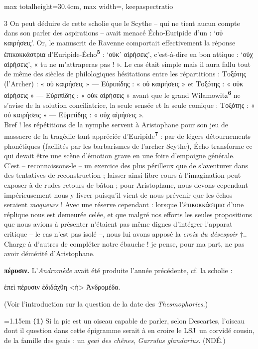 \documentclass[11pt,twoside]{book}
\newcommand{\italique}[1]{\textit{#1}}
\newcommand{\citComm}[1]{\begin{quoting}[vskip=0.4pt,leftmargin=0.7em,rightmargin=0.2em]#1\end{quoting}}
\newcommand{\LSJ}{LSJ}
\newcommand{\latin}[1]{\textit{#1}}
\newcommand{\marqueur}[1]{\textsuperscript{\color{rubricRed}\textbf{#1}}}
\begin{document}
\begin{adjustbox}{max totalheight=30.4cm, max width=\textwidth, keepaspectratio}
\begin{minipage}{\textwidth}
{\begin{multicols}{3}
\noindent On peut déduire de cette scholie que le Scythe – qui ne tient aucun compte dans son parler des aspirations – avait menacé Écho-Euripide d'un : `οὐ καιρήσεις'. Or, le manuscrit de Ravenne comportait effectivement la réponse ἐπικοκκάστρια d'Euripide-Écho\marqueur{5} : `οὐκ᾽ αἰρήσεις', c'est-à-dire en bon attique : `οὐχ αἱρήσεις', « tu ne m'attraperas pas ! ». Le cas était simple mais il aura fallu tout de même des siècles de philologiques hésitations entre les répartitions : Τοξότης (l'Archer) : « οὐ καιρήσεις » — Εὐριπίδης : « οὐ καιρήσεις » et Τοξότης : « οὐκ αἰρήσεις » — Εὐριπίδης : « οὐκ αἰρήσεις » avant que le grand Wilamowitz\marqueur{6} ne s'avise de la solution conciliatrice, la seule sensée et la seule comique : Τοξότης : « οὐ καιρήσεις » — Εὐριπίδης : « οὐχ αἱρήσεις ».\\ Bref ! les répétitions de la nymphe servent à Aristophane pour son jeu de massacre de la tragédie tant appréciée d'Euripide\marqueur{7} : par de légers détournements phonétiques (facilités par les barbarismes de l'archer Scythe), Écho transforme ce qui devait être une scène d'émotion grave en une foire d'empoigne générale.\\ C'est -- reconnaissons-le -- un exercice des plus périlleux que de s'aventurer dans des tentatives de reconstruction ; laisser ainsi libre cours à l'imagination peut exposer à de rudes retours de bâton ; pour Aristophane, nous devons cependant impérieusement nous y livrer puisqu'il vient de nous prévenir que les échos seraient \italique{moqueurs} ! Avec une réserve cependant : lorsque l'ἐπικοκκάστρια d'une réplique nous est demeurée celée, et que malgré nos efforts les seules propositions que nous avions à présenter n'étaient pas même dignes d'intégrer l'apparat critique -- le cas n'est pas isolé --, nous lui avons apposé la \italique{croix du désespoir} †.. Charge à d'autres de compléter notre ébauche ! je pense, pour ma part, ne pas avoir démérité d'Aristophane.
\par\vspace{1.5pt}
 \textbf{πέρυσιν.} L'\italique{Andromède} avait été produite l'année précédente, cf. la scholie :
\citComm{ἐπεὶ πέρυσιν ἐδιδάχθη <ἡ> Ἀνδρομέδα.}
\par\vspace{1.5pt}
\noindent (Voir l'introduction sur la question de la date des \italique{Thesmophories}.)
\par\vspace{1.5pt}
\par\vspace{1.2pt}\par\nopagebreak\vspace{1pt}\noindent\hangindent=1.15em {\color{sepiaNote}\textbf{(1)}} Si la pie est un oiseau capable de parler, selon Descartes, l'oiseau dont il question dans cette épigramme serait à en croire le \LSJ \ un corvidé cousin, de la famille des geais : un \italique{geai des chênes}, \latin{Garrulus glandarius}. (NDÉ.)

\end{multicols}}
\end{minipage}
\end{adjustbox}
\end{document}
